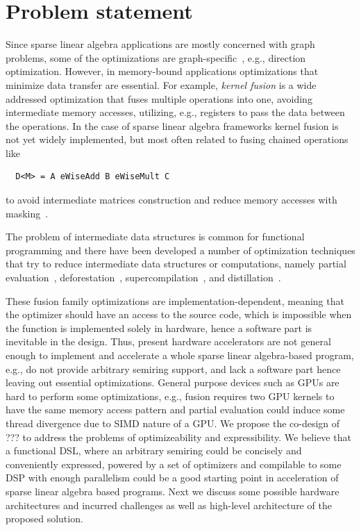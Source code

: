 \documentclass[10pt,conference]{IEEEtran}
\newcommand\todo[1]{{\color{red}#1}}
\begin{document}

\section{Problem statement}
Since sparse linear algebra applications are mostly concerned with graph problems, some of the optimizations are graph-specific~\cite{yang2020graphblast,graphIt}, e.g., direction optimization.
However, in memory-bound applications optimizations that minimize data transfer are essential. 
For example, \emph{kernel fusion} is a wide addressed optimization that fuses multiple operations into one, avoiding intermediate memory accesses, utilizing, e.g., registers to pass the data between the operations.
In the case of sparse linear algebra frameworks kernel fusion is not yet widely implemented, but most often related to fusing chained operations like
\begin{verbatim}
  D<M> = A eWiseAdd B eWiseMult C
\end{verbatim}
to avoid intermediate matrices construction and reduce memory accesses with masking~\cite{yang2020graphblast}.

The problem of intermediate data structures is common for functional programming
and there have been developed a number of 
optimization techniques that try to reduce intermediate 
data structures or computations, namely partial evaluation~\cite{jones}, deforestation~\cite{WADLER1990231}, supercompilation~\cite{supercompilation}, and distillation~\cite{distillation}.

These fusion family optimizations are implementation-dependent, meaning that the optimizer should have an access to the source code, which is impossible when the function is implemented solely in hardware, hence a software part is inevitable in the design.
Thus, present hardware accelerators are not general enough to implement and accelerate a whole sparse linear algebra-based program, e.g., do not provide arbitrary semiring support, and lack a software part hence leaving out essential optimizations.
General purpose devices such as GPUs are hard to perform some optimizations, e.g., fusion requires two GPU kernels to have the same memory access pattern and partial evaluation could induce some thread divergence due to SIMD nature of a GPU. We propose the co-design of \todo{???} to address the problems of optimizeability and expressibility.
We believe that a functional DSL, where an arbitrary semiring could be concisely and conveniently expressed, powered by a set of optimizers and compilable to some DSP with enough parallelism could be a good starting point in acceleration of sparse linear algebra based programs.
Next we discuss some possible hardware architectures and incurred challenges as well as high-level architecture of the proposed solution.
\end{document}
